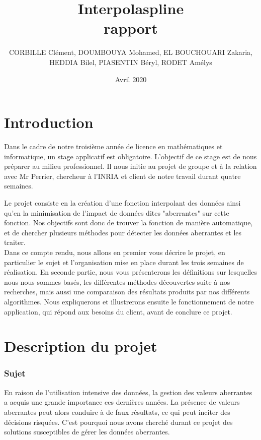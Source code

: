 \documentclass[a4paper,12pt]{article} %
\title{\textbf{Interpolaspline}\\ rapport}
\author{CORBILLE Clément, DOUMBOUYA Mohamed, EL BOUCHOUARI Zakaria, \\HEDDIA Bilel, PIASENTIN Béryl, RODET Amélys }
\date{Avril 2020}
\begin{document}
\maketitle

\newpage
\tableofcontents

\renewcommand\partname{}
\part{Introduction}
    Dans le cadre de notre troisième année de licence en mathématiques et informatique, un stage applicatif est obligatoire. L'objectif de ce stage est de nous préparer au milieu professionnel. Il nous initie au projet de groupe et à la relation avec Mr Perrier, chercheur à l'INRIA et client de notre travail durant quatre semaines. 

    Le projet consiste en la création d'une fonction interpolant des données ainsi qu'en la minimisation de l'impact de données dites "aberrantes" sur cette fonction. Nos objectifs sont donc de trouver la fonction de manière automatique, et de chercher plusieurs méthodes pour détecter les données aberrantes et les traiter.\\

    Dans ce compte rendu, nous allons en premier vous décrire le projet, en particulier le sujet et l'organisation mise en place durant les trois semaines de réalisation. En seconde partie, nous vous présenterons les définitions sur lesquelles nous nous sommes basés, les différentes méthodes découvertes suite à nos recherches, mais aussi une comparaison des résultats produits par nos différents algorithmes. Nous expliquerons et illustrerons ensuite le fonctionnement de notre application, qui répond aux besoins du client, avant de conclure ce projet.

\renewcommand\partname{}
\part{Description du projet}
	\section{Sujet}
	    En raison de l'utilisation intensive des données, la gestion des valeurs aberrantes a acquis une grande importance ces dernières années. La présence de valeurs aberrantes peut alors conduire à de faux résultats, ce qui peut inciter des décisions risquées.
		C'est pourquoi nous avons cherché durant ce projet des solutions susceptibles de gérer les données aberrantes.\\
		
\end{document}
